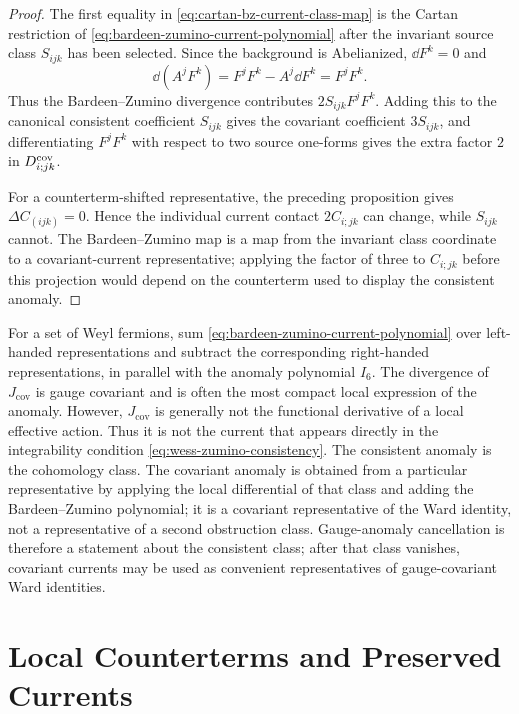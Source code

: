 \begin{proof}
The first equality in \eqref{eq:cartan-bz-current-class-map} is the
Cartan restriction of \eqref{eq:bardeen-zumino-current-polynomial} after
the invariant source class \(S_{ijk}\) has been selected.  Since the
background is Abelianized, \(\dd F^k=0\) and
\[
  \dd(A^jF^k)=F^jF^k-A^j\dd F^k=F^jF^k .
\]
Thus the Bardeen--Zumino divergence contributes \(2S_{ijk}F^jF^k\).
Adding this to the canonical consistent coefficient \(S_{ijk}\) gives the
covariant coefficient \(3S_{ijk}\), and differentiating \(F^jF^k\) with
respect to two source one-forms gives the extra factor \(2\) in
\(D_{i;jk}^{\rm cov}\).

For a counterterm-shifted representative, the preceding proposition gives
\(\Delta C_{(ijk)}=0\).  Hence the individual current contact
\(2C_{i;jk}\) can change, while \(S_{ijk}\) cannot.  The Bardeen--Zumino
map is a map from the invariant class coordinate to a covariant-current
representative; applying the factor of three to \(C_{i;jk}\) before this
projection would depend on the counterterm used to display the consistent
anomaly.
\end{proof}

For a set of Weyl fermions, sum \eqref{eq:bardeen-zumino-current-polynomial}
over left-handed representations and subtract the corresponding right-handed
representations, in parallel with the anomaly polynomial \(I_6\).
The divergence of \(J_{\mathrm{cov}}\) is gauge covariant and is often the most
compact local expression of the anomaly.  However,
\(J_{\mathrm{cov}}\) is generally not the functional derivative of a local
effective action.  Thus it is not the current that appears directly in the
integrability condition \eqref{eq:wess-zumino-consistency}.  The consistent
anomaly is the cohomology class.  The covariant anomaly is obtained from a
particular representative by applying the local differential of that class and
adding the Bardeen--Zumino polynomial; it is a covariant representative of the
Ward identity, not a representative of a second obstruction class.
Gauge-anomaly cancellation is therefore a statement about the consistent
class; after that class vanishes, covariant currents may be used as convenient
representatives of gauge-covariant Ward identities.

\section{Local Counterterms and Preserved Currents}

